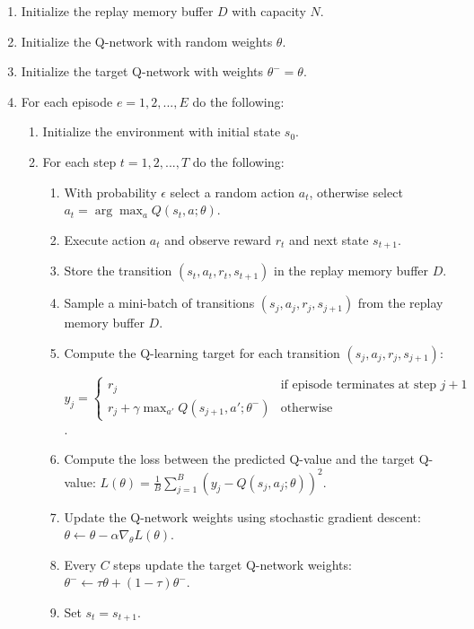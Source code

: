 \documentclass[12pt,oneside]{article}
\begin{document}
\begin{enumerate}
\item Initialize the replay memory buffer $D$ with capacity $N$.
\item Initialize the Q-network with random weights $\theta$.
\item Initialize the target Q-network with weights $\theta^{-} = \theta$.
\item For each episode $e=1,2,...,E$ do the following:
\begin{enumerate}
\item Initialize the environment with initial state $s_0$.
\item For each step $t=1,2,...,T$ do the following:
\begin{enumerate}
\item With probability $\epsilon$ select a random action $a_t$, otherwise select $a_t=\arg\max_{a} Q(s_t, a; \theta)$.
\item Execute action $a_t$ and observe reward $r_t$ and next state $s_{t+1}$.
\item Store the transition $(s_t, a_t, r_t, s_{t+1})$ in the replay memory buffer $D$.
\item Sample a mini-batch of transitions $(s_j, a_j, r_j, s_{j+1})$ from the replay memory buffer $D$.

\item Compute the Q-learning target for each transition $(s_j, a_j, r_j, s_{j+1})$:

 $y_j = \begin{cases} r_j & \text{if episode terminates at step } j+1 \\ r_j + \gamma\max_{a'}Q(s_{j+1},a';\theta^{-}) & \text{otherwise} \end{cases}$.

\item Compute the loss between the predicted Q-value and the target Q-value: $L(\theta) = \frac{1}{B}\sum_{j=1}^B(y_j-Q(s_j,a_j;\theta))^2$.
\item Update the Q-network weights using stochastic gradient descent: $\theta \leftarrow \theta - \alpha\nabla_\theta L(\theta)$.
\item Every $C$ steps update the target Q-network weights: $\theta^{-} \leftarrow \tau\theta + (1-\tau)\theta^{-}$.
\item Set $s_t=s_{t+1}$.
\end{enumerate}
\end{enumerate}
\end{enumerate}
\end{document}

